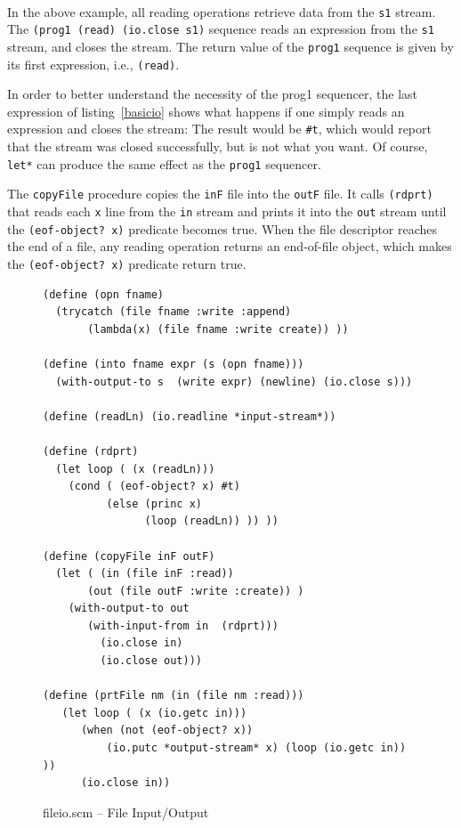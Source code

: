 \documentclass[a4paper,12pt]{book}
\newenvironment{fmpage}[1]
           {\begin{lrbox}{\fmbox}\begin{minipage}{#1}}
           {\end{minipage}\end{lrbox}\fbox{\usebox{\fmbox}}}
\begin{document}
\verb||\\
In the above example, all reading
operations retrieve data from the \verb|s1| stream.
The {\small \verb|(prog1 (read) (io.close s1)|}
sequence reads an expression from the \verb|s1|
stream, and closes the stream. The return
value of the \verb|prog1| sequence is given by its
first expression, i.e., \verb|(read)|.

In order to better understand the
necessity of the prog1 sequencer,
the last expression of listing~\ref{basicio}
shows what happens if one simply reads
an expression and closes the stream:
The result would be \verb|#t|, which
would report that the stream was closed 
successfully, but is not what you want.
Of course, \verb|let*| can produce
the same effect as the \verb|prog1| sequencer.

The \verb|copyFile| procedure copies
the \verb|inF| file into the \verb|outF| file.
It calls \verb|(rdprt)| that reads
each \verb|x| line from the \verb|in| stream
and prints it into the \verb|out| stream
until the \verb|(eof-object? x)| predicate
becomes true. When the file descriptor
reaches the end of a file, any reading
operation returns an end-of-file object,
which makes the \verb|(eof-object? x)| predicate
return true. 
\begin{figure}[!h]
\begin{fmpage}{0.95\textwidth}
\begin{verbatim}
(define (opn fname)
  (trycatch (file fname :write :append)
       (lambda(x) (file fname :write create)) ))

(define (into fname expr (s (opn fname)))
  (with-output-to s  (write expr) (newline) (io.close s)))

(define (readLn) (io.readline *input-stream*))

(define (rdprt)
  (let loop ( (x (readLn)))
    (cond ( (eof-object? x) #t)
          (else (princ x)
                (loop (readLn)) )) ))

(define (copyFile inF outF)
  (let ( (in (file inF :read))
       (out (file outF :write :create)) )
    (with-output-to out
       (with-input-from in  (rdprt)))
         (io.close in)
         (io.close out)))

(define (prtFile nm (in (file nm :read)))
   (let loop ( (x (io.getc in)))
      (when (not (eof-object? x))
          (io.putc *output-stream* x) (loop (io.getc in)) ))
      (io.close in))
\end{verbatim}
\end{fmpage}
\caption{fileio.scm -- File Input/Output}
\label{cpyFile}
\end{figure}
\end{document}
